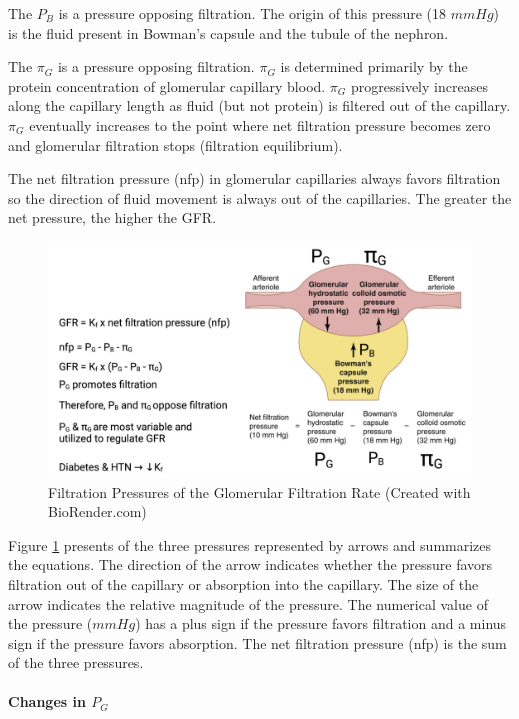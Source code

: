 The $P_{B}$ is a pressure opposing filtration. The origin of this pressure (18 $mm Hg$) is the fluid present in Bowman’s capsule and the tubule of the nephron.

The $\pi_{G}$ is a pressure opposing filtration. $\pi_{G}$ is determined primarily by the protein concentration of glomerular capillary blood. $\pi_{G}$ progressively increases along the capillary length as fluid (but not protein) is filtered out of the capillary. $\pi_{G}$ eventually increases to the point where net filtration pressure becomes zero and glomerular filtration stops (filtration equilibrium). 

The net filtration pressure (nfp) in glomerular capillaries always favors filtration so the direction of fluid movement is always out of the capillaries. The greater the net pressure, the higher the GFR.


\begin{figure}[!h]
    \centering
    \includegraphics[width=1\linewidth]{./figure/RBF_GFR.png}
    \caption{Filtration Pressures of the Glomerular Filtration Rate \footnotesize{(Created with BioRender.com)}}
    \label{fig:RBF_GFR}
\end{figure}

Figure \ref{fig:RBF_GFR} presents of the three pressures represented by arrows and summarizes the equations. The direction of the arrow indicates whether the pressure favors filtration out of the capillary or absorption into the capillary. The size of the arrow indicates the relative magnitude of the pressure. The numerical value of the pressure ($mm Hg$) has a plus sign if the pressure favors filtration and a minus sign if the pressure favors absorption. The net filtration pressure (nfp) is the sum of the three pressures.

\paragraph{Changes in $P_{G}$}


